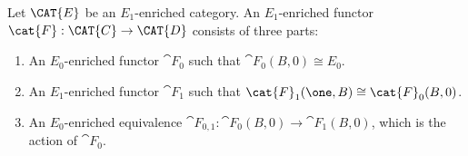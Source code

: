 \documentclass[a4paper,reqno,oneside]{article}
\begin{document}
\begin{definition}\label{defn.htp}
Let $\CAT{E}$ be an $E_1$-enriched category. An $E_1$-enriched functor $\cat{F} : \CAT{C} \rightarrow \CAT{D}$ consists of three parts:
\begin{enumerate}
\item An $E_0$-enriched functor $\cat{F}_0$ such that $\cat{F}_0(B, 0) \cong E_{0}$.
\item An $E_1$-enriched functor $\cat{F}_1$ such that $\cat{F}_1(\one,B) \cong \cat{F}_0(B, 0)$.
\item An $E_0$-enriched equivalence $\cat{F}_{0,1} : \cat{F}_0(B, 0) \rightarrow \cat{F}_1(B, 0)$, which is the action of $\cat{F}_0$.
\end{enumerate}
\end{definition}
\end{document}
